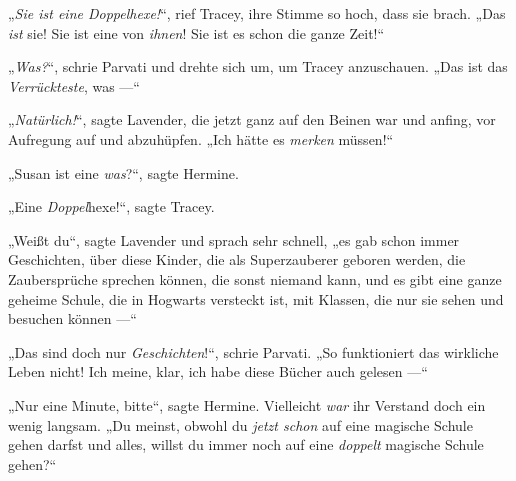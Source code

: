 „\emph{Sie ist eine Doppelhexe!}“, rief Tracey, ihre Stimme so hoch, dass sie brach.
„Das \emph{ist} sie! Sie ist eine von \emph{ihnen}! Sie ist es schon die ganze Zeit!“

„\emph{Was?}“, schrie Parvati und drehte sich um, um Tracey anzuschauen.
„Das ist das \emph{Verrückteste}, was —“

„\emph{Natürlich!}“, sagte Lavender, die jetzt ganz auf den Beinen war und anfing, vor Aufregung auf und abzuhüpfen.
„Ich hätte es \emph{merken} müssen!“

„Susan ist eine \emph{was}?“, sagte Hermine.

„Eine \emph{Doppel}{}hexe!“, sagte Tracey.

„Weißt du“, sagte Lavender und sprach sehr schnell, „es gab schon immer Geschichten, über diese Kinder, die als Superzauberer geboren werden, die Zaubersprüche sprechen können, die sonst niemand kann, und es gibt eine ganze geheime Schule, die in Hogwarts versteckt ist, mit Klassen, die nur sie sehen und besuchen können —“

„Das sind doch nur \emph{Geschichten}!“, schrie Parvati.
„So funktioniert das wirkliche Leben nicht! Ich meine, klar, ich habe diese Bücher auch gelesen —“

„Nur eine Minute, bitte“, sagte Hermine. Vielleicht \emph{war} ihr Verstand doch ein wenig langsam.
„Du meinst, obwohl du \emph{jetzt schon} auf eine magische Schule gehen darfst und alles, willst du immer noch auf eine \emph{doppelt} magische Schule gehen?“

